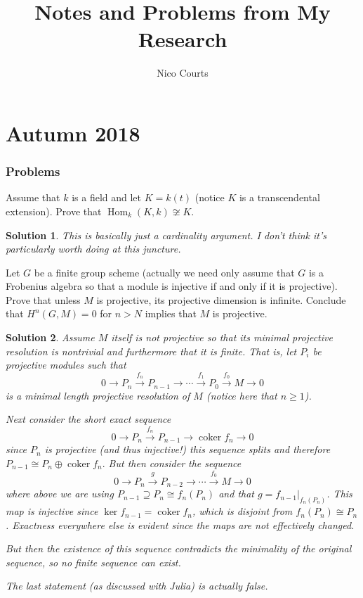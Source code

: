 \documentclass[12pt]{article}
\theoremstyle{nonumberbreak}
\newtheorem{sol}{Solution}
\theoremstyle{changebreak}
\theoremstyle{nonumberplain}
\theoremstyle{change}
\let\oldpart\part%
\renewcommand{\part}{\clearpage\oldpart}%
\DeclareMathOperator{\Hom}{Hom}
\DeclareMathOperator{\coker}{coker}
\begin{document}
\title{Notes and Problems from My Research\vspace{-1ex}}
\author{Nico Courts}
\date{}
\maketitle


\part{Autumn 2018}
\section{Problems}
\begin{prob}
	Assume that $k$ is a field and let $K=k(t)$ (notice $K$ is a transcendental extension). Prove that $\Hom_k(K,k)\not\cong K$.
\end{prob}

\begin{sol}
	This is basically just a cardinality argument. I don't think it's particularly worth doing at this juncture.
\end{sol}

\begin{prob}
	Let $G$ be a finite group scheme (actually we need only assume that $G$ is a Frobenius algebra so that a module
	is injective if and only if it is projective). Prove that unless $M$ is projective, its projective dimension is 
	infinite. Conclude that $H^n(G,M)=0$ for $n>N$ implies that $M$ is projective.
\end{prob}
\begin{sol}
	Assume $M$ itself is not projective so that its minimal projective resolution is nontrivial and furthermore
	that it is finite. That is, let $P_i$ be projective modules such that
	\[0\to P_n\xrightarrow{f_n} P_{n-1}\to\cdots \xrightarrow{f_{1}}P_0\xrightarrow{f_0} M\to 0\]
	is a minimal length projective resolution of $M$ (notice here that $n\ge 1$). 
	
	Next consider the short exact sequence
	\[0\to P_n\xrightarrow{f_n}P_{n-1}\to \coker f_n\to 0\]
	since $P_n$ is projective (and thus injective!) this sequence splits and therefore $P_{n-1}\cong P_n\oplus\coker f_n.$
	But then consider the sequence
	\[0\to P_n\xrightarrow{g} P_{n-2}\to\cdots\xrightarrow{f_0}M\to 0\]
	where above we are using $P_{n-1}\supseteq P_n\cong f_n(P_n)$  and that
	$g=f_{n-1}|_{f_n(P_n)}$. This map is injective since $\ker f_{n-1}=\coker f_n$, which is disjoint
	from $f_n(P_n)\cong P_n$. Exactness everywhere else is evident since the maps are not effectively changed.

	But then the existence of this sequence contradicts the minimality of the original sequence, so
	no finite sequence can exist.

	The last statement (as discussed with Julia) is actually false. 
\end{sol}
\end{document}
